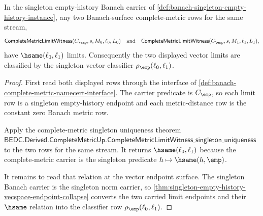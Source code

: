 \begin{theorem}
\label{thm:banach-singleton-limit-namecert-uniqueness}
In the singleton empty-history Banach carrier of
\autoref{def:banach-singleton-empty-history-instance}, any two Banach-surface
complete-metric rows for the same stream,
$$
\mathsf{CompleteMetricLimitWitness}(C_{\emp},s,M_0,\ell_0,L_0)
\quad\text{and}\quad
\mathsf{CompleteMetricLimitWitness}(C_{\emp},s,M_1,\ell_1,L_1),
$$
have $\hsame(\ell_0,\ell_1)$ limits. Consequently the two displayed vector
limits are classified by the singleton vector classifier
$\rho_{\emp}(\ell_0,\ell_1)$.
\end{theorem}
\begin{proof}
First read both displayed rows through the interface of
\autoref{def:banach-complete-metric-namecert-interface}. The carrier predicate
is $C_{\emp}$, so each limit row is a singleton empty-history endpoint and each
metric-distance row is the constant zero Banach metric row.

Apply the complete-metric singleton uniqueness theorem
$\mathsf{BEDC.Derived.CompleteMetricUp.CompleteMetricLimitWitness\_singleton\_uniqueness}$
to the two rows for the same stream. It returns
$\hsame(\ell_0,\ell_1)$ because the complete-metric carrier is the singleton
predicate $h\mapsto\hsame(h,\emp)$.

It remains to read that relation at the vector endpoint surface. The singleton
Banach carrier is the singleton norm carrier, so
\autoref{thm:singleton-empty-history-vecspace-endpoint-collapse} converts the
two carried limit endpoints and their $\hsame$ relation into the classifier row
$\rho_{\emp}(\ell_0,\ell_1)$.
\end{proof}


